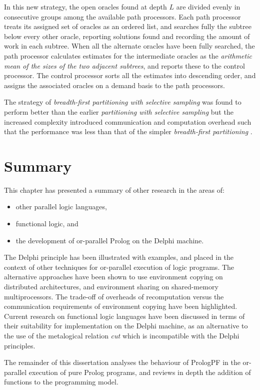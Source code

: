 \begin{itemize}
{  In this new strategy, the open oracles found at depth $L$ are divided evenly
  in consecutive groups among the available path processors.  Each path processor
  treats its assigned set of oracles as an ordered list, and searches fully the
  subtree below every other oracle, reporting solutions found and recording the amount
  of work in each subtree.  When all the alternate oracles have been fully searched,
  the path processor calculates estimates for the intermediate oracles as the
  \textit{arithmetic mean of the sizes of the two adjacent subtrees}, and reports these
  to the control processor.  The control processor sorts all the estimates into
  descending order, and assigns the associated oracles on a demand basis to
  the path processors.

  The strategy of \textit{breadth-first partitioning with selective sampling} was found
  to perform better than the earlier \textit{partitioning with selective sampling}
  but the increased complexity introduced communication and computation overhead such that
  the performance was less than that of the simpler \textit{breadth-first partitioning}
  \cite{Sar95}.
  }
\end{itemize}

\section{Summary} %

This chapter has presented a summary of other research in the areas of:
\begin{itemize}
\item{other parallel logic languages,}
\item{functional logic, and}
\item{the development of or-parallel Prolog on the Delphi machine.}
\end{itemize}

The Delphi principle has been illustrated with examples, and placed in the
context of other techniques for or-parallel execution of logic programs.
The alternative approaches have been shown to use environment copying on
distributed architectures, and environment sharing on shared-memory
multiprocessors.
The trade-off of overheads of recomputation versus the communication requirements of
environment copying have been highlighted.  Current research on functional logic languages
have been discussed in terms of their suitability for implementation on the Delphi
machine, as an alternative to the use of the metalogical relation \textit{cut} which is
incompatible with the Delphi principles.

The remainder of this dissertation analyses the behaviour of PrologPF in the or-parallel
execution of pure Prolog programs, and reviews in depth the addition of functions
to the programming model.










